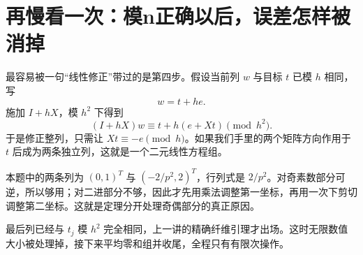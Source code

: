 \section{再慢看一次：模n正确以后，误差怎样被消掉}
最容易被一句“线性修正”带过的是第四步。假设当前列 $w$ 与目标 $t$ 已模 $h$ 相同，写
\[w=t+he.
\]
施加 $I+hX$，模 $h^2$ 下得到
\[(I+hX)w\equiv t+h(e+Xt)\pmod{h^2}.
\]
于是修正整列，只需让 $Xt\equiv-e\pmod h$。如果我们手里的两个矩阵方向作用于 $t$ 后成为两条独立列，这就是一个二元线性方程组。

本题中的两条列为 $(0,1)^T$ 与 $(-2/p^2,2)^T$，行列式是 $2/p^2$。对奇素数部分可逆，所以够用；对二进部分不够，因此才先用乘法调整第一坐标，再用一次下剪切调整第二坐标。这就是定理分开处理奇偶部分的真正原因。

最后列已经与 $t_j$ 模 $h^2$ 完全相同，上一讲的精确纤维引理才出场。这时无限数值大小被处理掉，接下来平均零和组并收尾，全程只有有限次操作。
